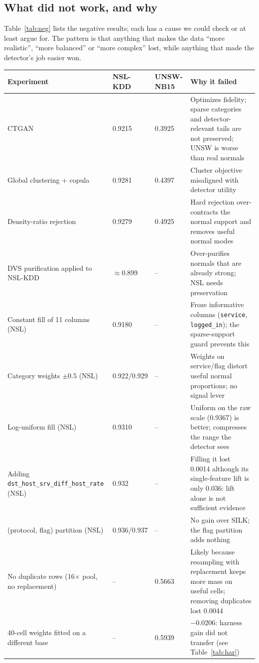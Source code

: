 \documentclass[10pt,a4paper]{article}
\begin{document}
\subsection{What did not work, and why}
Table~\ref{tab:neg} lists the negative results; each has a cause we could check or at least argue for. The pattern is that anything that makes the data ``more realistic'', ``more balanced'' or ``more complex'' lost, while anything that made the detector's job easier won.

\begin{table}[!t]\centering\small
\begin{tabular}{P{3.8cm}P{1.6cm}P{1.5cm}P{8.2cm}}\toprule
Experiment & NSL-KDD & UNSW-NB15 & Why it failed\\\midrule
CTGAN~\cite{ctgan} & 0.9215 & 0.3925 & Optimizes fidelity; sparse categories and detector-relevant tails are not preserved; UNSW is worse than real normals\\
Global clustering + copula & 0.9281 & 0.4397 & Cluster objective misaligned with detector utility\\
Density-ratio rejection & 0.9279 & 0.4925 & Hard rejection over-contracts the normal support and removes useful normal modes\\
DVS purification applied to NSL-KDD & $\approx$0.899 & -- & Over-purifies normals that are already strong; NSL needs preservation\\
Constant fill of 11 columns (NSL) & 0.9180 & -- & Froze informative columns (\texttt{service}, \texttt{logged\_in}); the sparse-support guard prevents this\\
Category weights $\pm0.5$ (NSL) & 0.922/0.929 & -- & Weights on service/flag distort useful normal proportions; no signal lever\\
Log-uniform fill (NSL) & 0.9310 & -- & Uniform on the raw scale (0.9367) is better; compresses the range the detector sees\\
Adding \texttt{dst\_host\_srv\_\allowbreak diff\_host\_rate} (NSL) & 0.932 & -- & Filling it lost 0.0014 although its single-feature lift is only 0.036: lift alone is not sufficient evidence\\
(protocol, flag) partition (NSL) & 0.936/0.937 & -- & No gain over SILK; the flag partition adds nothing\\
No duplicate rows (16$\times$ pool, no replacement) & -- & 0.5663 & Likely because resampling with replacement keeps more mass on useful cells; removing duplicates lost 0.0044\\
40-cell weights fitted on a different base & -- & 0.5939 & $-0.0206$: harness gain did not transfer (see Table~\ref{tab:har})\\

\end{tabular}
\end{table}
\end{document}
